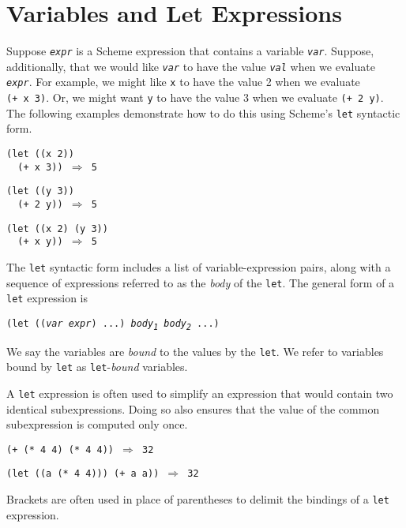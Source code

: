 \section{\label{start_g17}\label{start_h4}Variables and Let Expressions\label{start_SECTGSIDENTIFIERS}}



\label{start_s50}Suppose \texttt{\textit{expr}} is a Scheme expression that contains
a variable \texttt{\textit{var}}.
Suppose, additionally, that we would like \texttt{\textit{var}} to have the value 
\texttt{\textit{val}} when we evaluate \texttt{\textit{expr}}.
For example, we might like \texttt{x} to have the value 2 when we 
evaluate \texttt{(+ x 3)}.
Or, we might want \texttt{y} to have the value 3 when we evaluate 
\texttt{(+ 2 y)}.
The following examples demonstrate how to do this using Scheme's
\label{start_s51}\texttt{let} syntactic form.


\begin{alltt}
(let ((x 2))
  (+ x 3)) \(\Rightarrow\) 5

(let ((y 3))
  (+ 2 y)) \(\Rightarrow\) 5

(let ((x 2) (y 3))
  (+ x y)) \(\Rightarrow\) 5
\end{alltt}


The \texttt{let} syntactic form includes a list of variable-expression pairs, 
along with a sequence of expressions referred to as the \textit{body} of the
\texttt{let}. 
The general form of a \texttt{let} expression is


\texttt{(let ((\textit{var} \textit{expr}) ...) \textit{body\textsubscript{1}} \textit{body\textsubscript{2}} ...)}

\label{start_s52}We say the variables are \textit{bound} to the
values by the \texttt{let}.
We refer to variables bound by \texttt{let} as
\label{start_s53}\texttt{let}-\textit{bound} variables.


A \texttt{let} expression is often used to simplify an expression that
would contain two identical subexpressions.
Doing so also ensures that the
value of the common subexpression is computed only once.


\begin{alltt}
(+ (* 4 4) (* 4 4)) \(\Rightarrow\) 32

(let ((a (* 4 4))) (+ a a)) \(\Rightarrow\) 32
\end{alltt}


Brackets are often used in place of parentheses to delimit the bindings of
a \texttt{let} expression.


